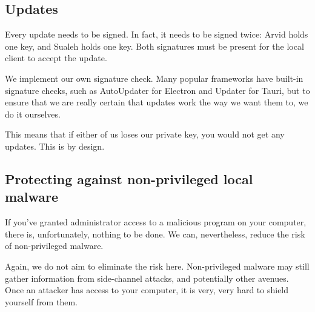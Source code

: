 





\subsection{Updates}

Every update needs to be signed. In fact, it needs to be signed twice: Arvid holds one key, and Sualeh holds one key. Both signatures must be present for the local client to accept the update.

We implement our own signature check. Many popular frameworks have built-in signature checks, such as AutoUpdater for Electron and Updater for Tauri, but to ensure that we are really certain that updates work the way we want them to, we do it ourselves.

This means that if either of us loses our private key, you would not get any updates. This is by design.

\subsection{Protecting against non-privileged local malware}

If you've granted administrator access to a malicious program on your computer, there is, unfortunately, nothing to be done. We can, nevertheless, reduce the risk of non-privileged malware.


Again, we do not aim to eliminate the risk here. Non-privileged malware may still gather information from side-channel attacks, and potentially other avenues. Once an attacker has access to your computer, it is very, very hard to shield yourself from them.